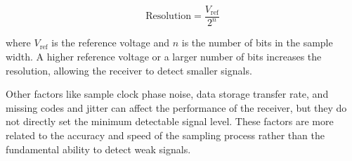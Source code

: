 \[
\text{Resolution} = \frac{V_{\text{ref}}}{2^n}
\]

where \( V_{\text{ref}} \) is the reference voltage and \( n \) is the number of bits in the sample width. A higher reference voltage or a larger number of bits increases the resolution, allowing the receiver to detect smaller signals. 

Other factors like sample clock phase noise, data storage transfer rate, and missing codes and jitter can affect the performance of the receiver, but they do not directly set the minimum detectable signal level. These factors are more related to the accuracy and speed of the sampling process rather than the fundamental ability to detect weak signals.

